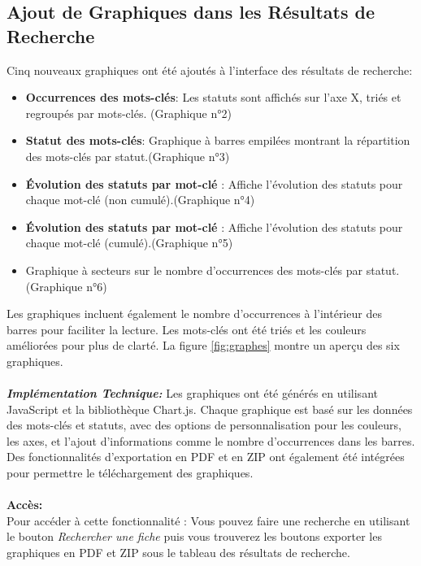 \documentclass[12pt]{article}
\begin{document}
    \subsection{Ajout de Graphiques dans les Résultats de\\ Recherche}
    Cinq nouveaux graphiques ont été ajoutés à l'interface des résultats de recherche:\\
    \begin{itemize}
        \item \textbf{Occurrences des mots-clés}:
        Les statuts sont affichés sur l'axe X, triés et regroupés par mots-clés. (Graphique n°2)
        \item \textbf{Statut des mots-clés}: Graphique à barres empilées montrant la répartition des mots-clés par statut.(Graphique n°3)
        \item \textbf{Évolution des statuts par mot-clé} : Affiche l'évolution des statuts pour chaque mot-clé (non cumulé).(Graphique n°4)
        \item \textbf{Évolution des statuts par mot-clé} : Affiche l'évolution des statuts pour chaque mot-clé (cumulé).(Graphique n°5)
        \item Graphique à secteurs sur le nombre d'occurrences des mots-clés par statut.(Graphique n°6)
    \end{itemize}
    Les graphiques incluent également le nombre d'occurrences à l'intérieur des barres pour faciliter la lecture. Les mots-clés ont été triés et les couleurs améliorées pour plus de clarté. La figure \ref{fig:graphes} montre un aperçu des six graphiques.\\
    \\
    \textit{\textbf{Implémentation Technique:}}
    Les graphiques ont été générés en utilisant JavaScript et la bibliothèque Chart.js. Chaque graphique est basé sur les données des mots-clés et statuts, avec des options de personnalisation pour les couleurs, les axes, et l'ajout d'informations comme le nombre d'occurrences dans les barres. Des fonctionnalités d'exportation en PDF et en ZIP ont également été intégrées pour permettre le téléchargement des graphiques.\\
    \\
    \textbf{Accès: } \\
    Pour accéder à cette fonctionnalité : Vous pouvez faire une recherche en utilisant le bouton \textit{Rechercher une fiche} puis vous trouverez les boutons exporter les graphiques en PDF et ZIP sous le tableau des résultats de recherche.
\end{document}
